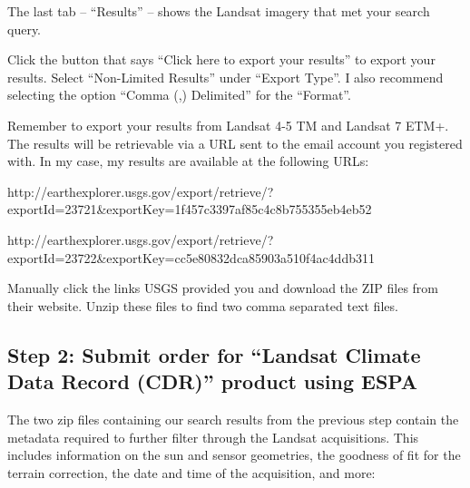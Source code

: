 \documentclass{article}
\begin{document}
The last tab -- ``Results'' -- shows the Landsat imagery that met your
search query.

Click the button that says ``Click here to export your results'' to
export your results. Select ``Non-Limited Results'' under ``Export
Type''. I also recommend selecting the option ``Comma (,) Delimited''
for the ``Format''.

Remember to export your results from Landsat 4-5 TM and Landsat 7 ETM+.
The results will be retrievable via a URL sent to the email account you
registered with. In my case, my results are available at the following
URLs:

http://earthexplorer.usgs.gov/export/retrieve/?exportId=23721\&exportKey=1f457c3397af85c4c8b755355eb4eb52

http://earthexplorer.usgs.gov/export/retrieve/?exportId=23722\&exportKey=cc5e80832dca85903a510f4ac4ddb311

Manually click the links USGS provided you and download the ZIP files
from their website. Unzip these files to find two comma separated text
files.

    \subsection{Step 2: Submit order for ``Landsat Climate Data Record
(CDR)'' product using ESPA}

The two zip files containing our search results from the previous step
contain the metadata required to further filter through the Landsat
acquisitions. This includes information on the sun and sensor
geometries, the goodness of fit for the terrain correction, the date and
time of the acquisition, and more:
\end{document}

